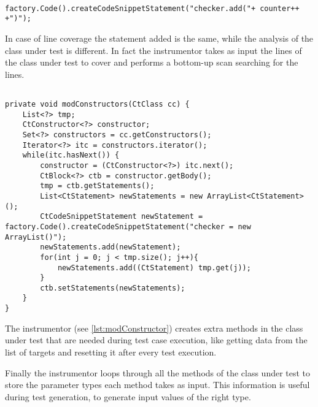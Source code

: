 \begin{minipage}{\linewidth}
\begin{lstlisting}[caption={Snippet creation},label={lst:addSnippet}]% Start your code-block
	
factory.Code().createCodeSnippetStatement("checker.add("+ counter++ +")");
\end{lstlisting}
\end{minipage}

In case of line coverage the statement added is the same, while the analysis of the class under test is different. In fact the instrumentor takes as input the lines of the class under test to cover and performs a bottom-up scan searching for the lines.

\begin{minipage}{\linewidth}
\begin{lstlisting}[caption={The function to add the ArrayList instantiation snippet},label={lst:modConstructor}]% Start your code-block

private void modConstructors(CtClass cc) {
	List<?> tmp;
	CtConstructor<?> constructor;
	Set<?> constructors = cc.getConstructors();
	Iterator<?> itc = constructors.iterator();
	while(itc.hasNext()) {
		constructor = (CtConstructor<?>) itc.next();
		CtBlock<?> ctb = constructor.getBody();
		tmp = ctb.getStatements();
		List<CtStatement> newStatements = new ArrayList<CtStatement>();
		CtCodeSnippetStatement newStatement = factory.Code().createCodeSnippetStatement("checker = new ArrayList()");
		newStatements.add(newStatement);
		for(int j = 0; j < tmp.size(); j++){
			newStatements.add((CtStatement) tmp.get(j));
		}
		ctb.setStatements(newStatements);
	}
}
\end{lstlisting}
\end{minipage}

The instrumentor (see \autoref{lst:modConstructor})
creates extra methods in the class under test that are needed during test case execution, like getting data from the list of targets and resetting it after  every test execution.

Finally the instrumentor loops through all the methods of the class under test to store the parameter types each method takes as input. This information is useful during test generation, to generate input values of the right type.